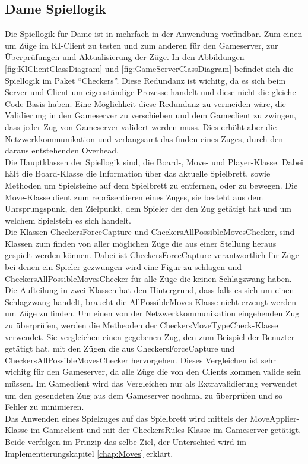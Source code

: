 \documentclass[12pt,a4paper,bibliography=totocnumbered,listof=totocnumbered]{article}
\begin{document}
\subsection{Dame Spiellogik}
\label{chap:Spiellogik}
Die Spiellogik für Dame ist in mehrfach in der Anwendung vorfindbar. Zum einen um Züge im KI-Client zu testen und zum anderen
für den Gameserver, zur Überprüfungen und Aktualisierung der Züge. In den Abbildungen \ref{fig:KIClientClassDiagram} und \ref{fig:GameServerClassDiagram}
befindet sich die Spiellogik im Paket "`Checkers"'. Diese Redundanz ist wichitg, da es sich beim Server und Client um eigenständige Prozesse handelt 
und diese nicht die gleiche Code-Basis haben. Eine Möglichkeit diese Redundanz zu vermeiden wäre, die Validierung in den Gameserver zu verschieben und 
dem Gameclient zu zwingen, dass jeder Zug von Gameserver validert werden muss. Dies erhöht aber die Netzwerkkommunikation und verlangsamt das finden eines Zuges, 
durch den daraus entstehenden Overhead. 
\\
Die Hauptklassen der Spiellogik sind, die Board-, Move- und Player-Klasse. Dabei hält die Board-Klasse die Information über das aktuelle Spielbrett, sowie 
Methoden um Spielsteine auf dem Spielbrett zu entfernen, oder zu bewegen. Die Move-Klasse dient zum repräsentieren eines Zuges, sie besteht aus dem 
Uhrsprungspunk, den Zielpunkt, dem Spieler der den Zug getätigt hat und um welchem Spielstein es sich handelt. 
\\
Die Klassen CheckersForceCapture und CheckersAllPossibleMovesChecker, sind Klassen zum finden von aller möglichen Züge die aus einer Stellung heraus gespielt werden
können. Dabei ist CheckersForceCapture verantwortlich für Züge bei denen ein Spieler gezwungen wird eine Figur zu schlagen und CheckersAllPossibleMovesChecker 
für alle Züge die keinen Schlagzwang haben. Die Aufteilung in zwei Klassen hat den Hintergrund, dass falls es sich um einen Schlagzwang handelt, braucht 
die AllPossibleMoves-Klasse nicht erzeugt werden um Züge zu finden. Um einen von der Netzwerkkommunikation eingehenden Zug zu überprüfen, 
werden die Metheoden der CheckersMoveTypeCheck-Klasse verwendet. Sie vergleichen einen gegebenen Zug, 
den zum Beispiel der Benuzter getätigt hat, mit den Zügen die aus CheckersForceCapture und CheckersAllPossibleMovesChecker
hervorgehen. Dieses Vergleichen ist sehr wichitg für den Gameserver, da alle Züge die von den Clients kommen valide sein müssen. Im Gameclient wird das Vergleichen nur 
als Extravalidierung verwendet um den gesendeten Zug aus dem Gameserver nochmal zu überprüfen und so Fehler zu minimieren.
\\
Das Anwenden eines Spielzuges auf das Spielbrett wird mittels der MoveApplier-Klasse im Gameclient und mit der CheckersRules-Klasse im Gameserver 
getätigt. Beide verfolgen im Prinzip das selbe Ziel, der Unterschied wird im Implementierungskapitel \ref{chap:Moves} erklärt.
\end{document}
